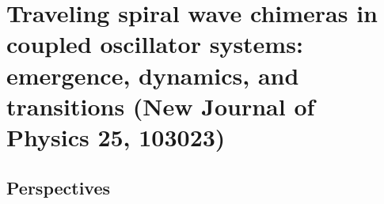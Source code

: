 \chapter{Traveling spiral wave chimeras in coupled
oscillator systems: emergence, dynamics, and
transitions (New Journal of Physics 25, 103023)}



\section{Perspectives}